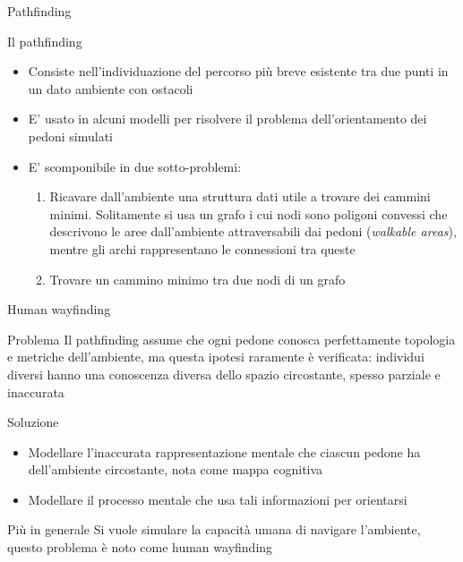 \documentclass{beamer}
\begin{document}
\begin{frame}{Pathfinding}
\begin{block}{Il pathfinding}
\begin{itemize}
    \item Consiste nell'individuazione del percorso più breve esistente tra due punti in un dato ambiente con ostacoli
    \item E' usato in alcuni modelli per risolvere il problema dell'orientamento dei pedoni simulati
    \item E' scomponibile in due sotto-problemi:
    \begin{enumerate}
        \item Ricavare dall'ambiente una struttura dati utile a trovare dei cammini minimi. Solitamente si usa un grafo i cui nodi sono \textcolor{bostonuniversityred}{poligoni convessi} che descrivono le aree dall'ambiente attraversabili dai pedoni (\emph{walkable areas}), mentre gli archi rappresentano le connessioni tra queste
        \item Trovare un cammino minimo tra due nodi di un grafo
    \end{enumerate}
\end{itemize}
\end{block}
\end{frame}

\begin{frame}{Human wayfinding}
\begin{alertblock}{Problema}
Il pathfinding assume che ogni pedone conosca perfettamente topologia e metriche dell'ambiente, ma questa ipotesi raramente è verificata: individui diversi hanno una \textcolor{bostonuniversityred}{conoscenza diversa} dello spazio circostante, spesso parziale e inaccurata
\end{alertblock}
\begin{block}{Soluzione}
\begin{itemize}
    \item Modellare l'inaccurata rappresentazione mentale che ciascun pedone ha dell’ambiente circostante, nota come mappa cognitiva
    \item Modellare il processo mentale che usa tali informazioni per orientarsi
\end{itemize}
\end{block}
\begin{block}{Più in generale}
Si vuole simulare la capacità umana di navigare l'ambiente, questo problema è noto come \textcolor{bostonuniversityred}{human wayfinding}
\end{block}
\end{frame}
\end{document}
